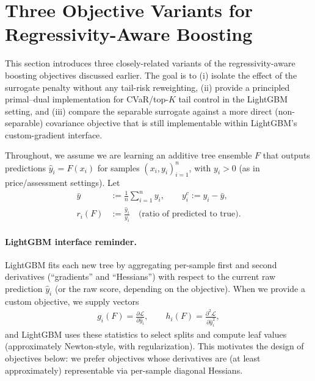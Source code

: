 \documentclass[11pt]{article}
\theoremstyle{plain}
\theoremstyle{definition}
\newcommand{\1}{\mathbf{1}}
\begin{document}
\newpage

\section{Three Objective Variants for Regressivity-Aware Boosting}
\label{sec:three_variants}

This section introduces three closely-related variants of the regressivity-aware boosting objectives discussed earlier. The goal is to (i) isolate the effect of the surrogate penalty without any tail-risk reweighting, (ii) provide a principled primal--dual implementation for CVaR/top-$K$ tail control in the LightGBM setting, and (iii) compare the separable surrogate against a more direct (non-separable) covariance objective that is still implementable within LightGBM's custom-gradient interface.

Throughout, we assume we are learning an additive tree ensemble $F$ that outputs predictions $\hat y_i = F(x_i)$ for samples $(x_i,y_i)_{i=1}^n$, with $y_i>0$ (as in price/assessment settings). Let
\begin{align}
\bar y &:= \frac{1}{n}\sum_{i=1}^n y_i, \qquad y_i^c := y_i-\bar y, \\
 r_i(F) &:= \frac{\hat y_i}{y_i} \quad \text{(ratio of predicted to true)}.
\end{align}

\paragraph{LightGBM interface reminder.}
LightGBM fits each new tree by aggregating per-sample first and second derivatives (``gradients'' and ``Hessians'') with respect to the current raw prediction $\hat y_i$ (or the raw score, depending on the objective). When we provide a custom objective, we supply vectors
\begin{align}
 g_i(F) = \frac{\partial \mathcal{L}}{\partial \hat y_i}, \qquad h_i(F) = \frac{\partial^2 \mathcal{L}}{\partial \hat y_i^2},
\end{align}
and LightGBM uses these statistics to select splits and compute leaf values (approximately Newton-style, with regularization). This motivates the design of objectives below: we prefer objectives whose derivatives are (at least approximately) representable via per-sample diagonal Hessians.
\end{document}
